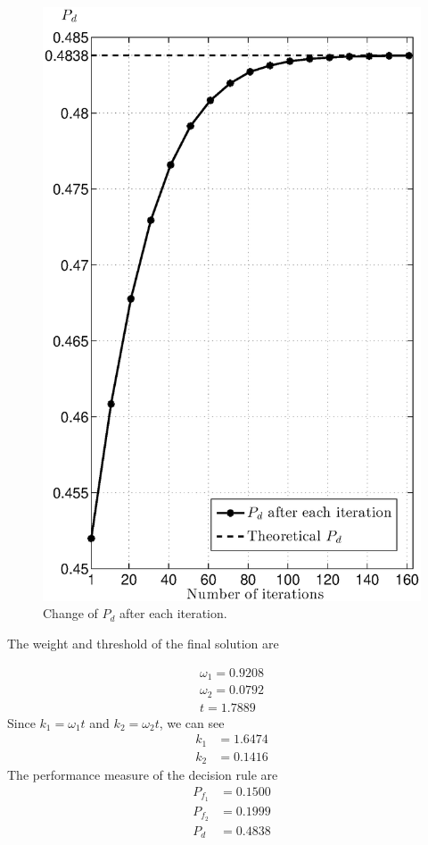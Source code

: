 \begin{figure}[H]
\centering
\includegraphics[width = 14cm]{2/152pd.eps}
\caption{Change of $P_d$ after each iteration.}
\label{fig: 2.2}
\end{figure}
\newpage

The weight and threshold of the final solution are

\[
\begin{split}
\omega_1 = 0.9208\\
\omega_2 = 0.0792\\
t = 1.7889
\end{split}
\]
Since $k_1 = \omega_1 t$ and $k_2 = \omega_2 t$, we can see
\[
\begin{split}
k_1 &= 1.6474\\
k_2 &= 0.1416
\end{split}
\]
The performance measure of the decision rule are
\[
\begin{split}
P_{f_1} &= 0.1500\\
P_{f_2} &= 0.1999\\
P_d &= 0.4838
\end{split}
\]


